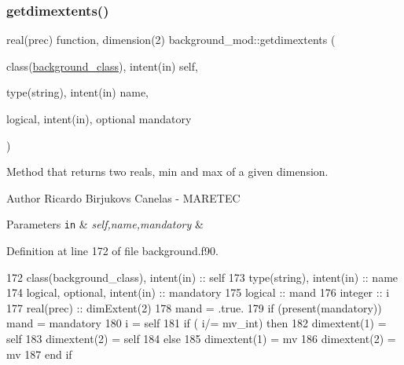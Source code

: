 \mbox{\label{namespacebackground__mod_a64c3966a113bc0f3b603c591bc345ca1}} 
\subsubsection{\texorpdfstring{getdimextents()}{getdimextents()}}
{\footnotesize\ttfamily real(prec) function, dimension(2) background\+\_\+mod\+::getdimextents (\begin{DoxyParamCaption}\item[{class(\mbox{\hyperlink{structbackground__mod_1_1background__class}{background\+\_\+class}}), intent(in)}]{self,  }\item[{type(string), intent(in)}]{name,  }\item[{logical, intent(in), optional}]{mandatory }\end{DoxyParamCaption})\hspace{0.3cm}{\ttfamily [private]}}



Method that returns two reals, min and max of a given dimension. 

\begin{DoxyAuthor}{Author}
Ricardo Birjukovs Canelas -\/ M\+A\+R\+E\+T\+EC 
\end{DoxyAuthor}

\begin{DoxyParams}[1]{Parameters}
\mbox{\tt in}  & {\em self,name,mandatory} & \\
\hline
\end{DoxyParams}


Definition at line 172 of file background.\+f90.


\begin{DoxyCode}
172     \textcolor{keywordtype}{class}(background\_class), \textcolor{keywordtype}{intent(in)} :: self
173     \textcolor{keywordtype}{type}(string), \textcolor{keywordtype}{intent(in)} :: name
174     \textcolor{keywordtype}{logical}, \textcolor{keywordtype}{optional}, \textcolor{keywordtype}{intent(in)} :: mandatory
175     \textcolor{keywordtype}{logical} :: mand
176     \textcolor{keywordtype}{integer} :: i
177     \textcolor{keywordtype}{real(prec)} :: dimExtent(2)
178     mand = .true.
179     \textcolor{keywordflow}{if} (\textcolor{keyword}{present}(mandatory)) mand = mandatory
180     i = self%
181     \textcolor{keywordflow}{if} ( i/= mv\_int) \textcolor{keywordflow}{then}
182         dimextent(1) = self%
183         dimextent(2) = self%
184     \textcolor{keywordflow}{else}
185         dimextent(1) = mv
186         dimextent(2) = mv
187 \textcolor{keywordflow}{    end if}
\end{DoxyCode}
\mbox{\label{namespacebackground__mod_a8a4c5fdcda63376bc3a984e9612dfb63}} 
